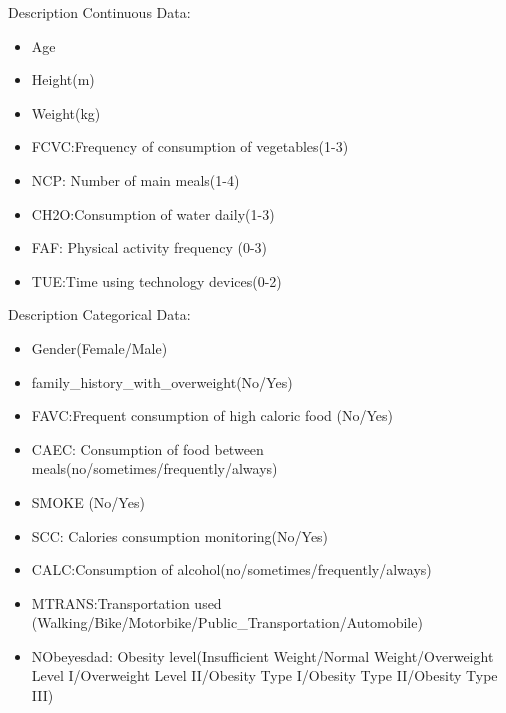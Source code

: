 \documentclass[11pt]{beamer}
\begin{document}
\begin{frame}{Description}
Continuous Data:
\begin{itemize}
    \item Age
    \item Height(m)
    \item Weight(kg)
    \item FCVC:Frequency of consumption of vegetables(1-3)
    \item NCP: Number of main meals(1-4)
    \item CH2O:Consumption of water daily(1-3)
    \item FAF: Physical activity frequency (0-3)
    \item TUE:Time using technology devices(0-2) 
\end{itemize}

\end{frame}

\begin{frame}{Description}
Categorical Data:
\begin{itemize}
\item Gender(Female/Male)
    \item family\_history\_with\_overweight(No/Yes)
    \item FAVC:Frequent consumption of high caloric food (No/Yes)
    \item CAEC: Consumption of food between meals(no/sometimes/frequently/always) 
    \item SMOKE (No/Yes)
    \item SCC: Calories consumption monitoring(No/Yes)
    \item CALC:Consumption of alcohol(no/sometimes/frequently/always) 
    \item MTRANS:Transportation used (Walking/Bike/Motorbike/Public\_Transportation/Automobile)
    \item NObeyesdad: Obesity level(Insufficient Weight/Normal Weight/Overweight Level I/Overweight Level II/Obesity Type I/Obesity Type II/Obesity Type III)

\end{itemize}
\end{frame}
\end{document}

